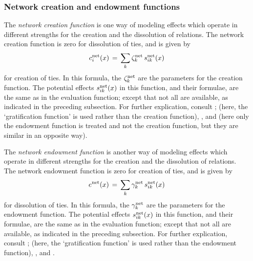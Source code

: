 \documentclass[a4paper,fleqn,11pt]{article}
\newcommand{\+}{\, + \,}
\begin{document}
\subsubsection{Network creation and endowment functions}
\label{S_c}
\label{S_e}

The \emph{network creation function}
is one way of modeling effects which operate in
different strengths for the creation and the dissolution of
relations.
The network creation function is zero for dissolution of ties,
and is given by
\begin{equation}
c^{\rm net}_i(x) \, = \, \sum_k \zeta_k^{\rm net} \, s^{\rm net}_{ik}(x)
                             \label{c_net}
\end{equation}
for creation of ties.
In this formula, the $\zeta_k^{\rm net}$
are the parameters for the creation function.
The potential effects $s^{\rm net}_{ik}(x) $ in this function, and their
formulae, are the same as in the evaluation function;
except that not all are available, as indicated in the preceding subsection.
For further explication, consult \citet{Snijders01, Snijders05};
(here, the `gratification function' is used rather than the creation function),
\citet*{SnijdersEA07}, and \citet*{SteglichEA10}
(here only the endowment function is treated and not the creation function,
but they are similar in an opposite way).

The \emph{network endowment function}
is another way of modeling effects which operate in
different strengths for the creation and the dissolution of
relations.
The network endowment function is zero for creation of ties,
and is given by
\begin{equation}
e^{\rm net}(x) \, = \, \sum_k \gamma^{\rm net}_k \, s^{\rm net}_{ik}(x)
                                                           \label{e_net}
\end{equation}
for dissolution of ties.
In this formula, the $\gamma_k^{\rm net}$
are the parameters for the endowment function.
The potential effects $s^{\rm net}_{ik}(x) $ in this function, and their
formulae, are the same as in the evaluation function;
except that not all are available, as indicated in the preceding subsection.
For further explication, consult \citet{Snijders01, Snijders05};
(here, the `gratification function' is used rather than the endowment function),
\citet*{SnijdersEA07}, and \citet*{SteglichEA10}.
\end{document}
